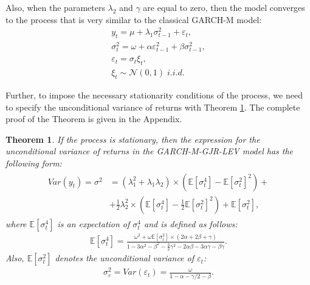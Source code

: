 \documentclass[authoryear, 1p]{elsarticle}
\newtheorem{thm}{Theorem}
\numberwithin{equation}{section}
\begin{document}
Also, when the parameters $\lambda_{2}$ and $\gamma$ are equal to zero, then the model converges to the process that is very similar to the classical GARCH-M model:
\begin{equation}
\begin{gathered}
y_{t} = \mu + \lambda_{1} \sigma^2_{t-1} + \varepsilon_{t}, \\ 
\sigma^2_{t} = \omega + \alpha \varepsilon^2_{t-1} + \beta \sigma^2_{t-1}, \\ 
\varepsilon_{t} = \sigma_{t} \xi_{t}, \\
\xi_{t} \sim \mathcal{N}
\left(0,1\right) \; i.i.d.
\end{gathered}
\end{equation}

Further, to impose the necessary stationarity conditions of the process, we need to specify the unconditional variance of returns with Theorem \ref{thm:thm_1}. The complete proof of the Theorem is given in the Appendix.
\begin{thm} \label{thm:thm_1}
If the process is stationary, then the expression for the unconditional variance of returns in the GARCH-M-GJR-LEV model has the following form:
\begin{align}\label{eqn:eq_1}
\begin{split}
Var\left(y_{t}\right) = \sigma^2  & =\left(\lambda_{1}^2 + \lambda_{1} \lambda_{2}\right) \times \left(\mathbb{E}\left[\sigma^4_{t}\right] - \mathbb{E}\left[\sigma^2_{t}\right]^2\right) + \\
& + \frac{1}{2} \lambda^2_{2} \times \left(\mathbb{E}\left[\sigma^4_{t}\right] - \frac{1}{2} \mathbb{E}\left[\sigma^2_{t}\right]^2\right) + \mathbb{E}\left[\sigma^2_{t}\right],
\end{split}
\end{align}
where $\mathbb{E}\left[\sigma^4_{t}\right]$ is an expectation of $\sigma^4_{t}$ and is defined as follows:
\begin{align}
\mathbb{E}\left[\sigma_{t}^4\right] = \frac{\omega^2 + \omega \mathbb{E}\left[\sigma^2_{t}\right] \times (2\alpha + 2\beta + \gamma)}{1 - 3\alpha ^ 2 - \beta^2 - \frac{3}{2}\gamma ^ 2 - 2\alpha\beta - 3\alpha\gamma - \beta\gamma}.
\end{align}
Also, $\mathbb{E}\left[\sigma^2_{t}\right]$ denotes the unconditional variance of $\varepsilon_{t}$: 
\begin{align}
\sigma^2_{\varepsilon} = Var(\varepsilon_{t}) = \frac{\omega}{1 - \alpha - \gamma / 2 - \beta}.
\end{align}
\end{thm}
\end{document}
